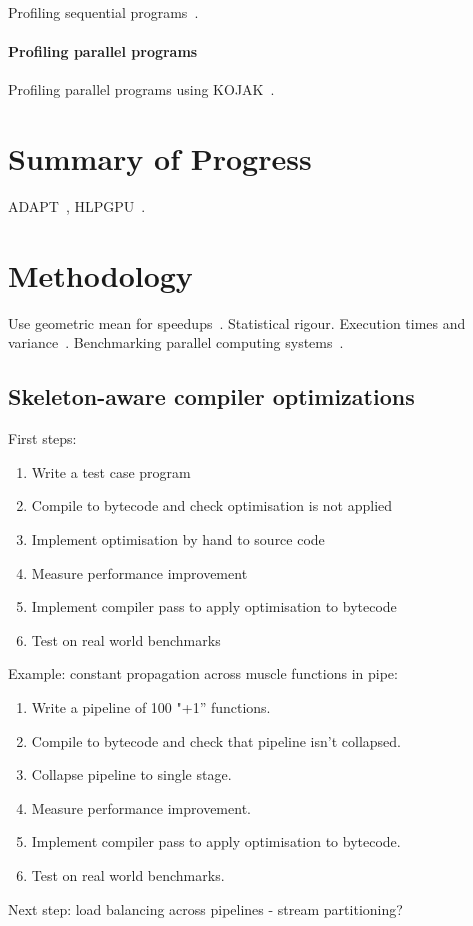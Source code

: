 Profiling sequential programs~\cite{Ball1994}.

\paragraph{Profiling parallel programs} Profiling parallel programs
using KOJAK~\cite{Mohr2003}.


\section{Summary of Progress}

ADAPT~\cite{Cummins2015a}, HLPGPU~\cite{Cummins2016}.


\section{Methodology}

Use geometric mean for speedups~\cite{Fleming1986}. Statistical
rigour\cite{Georges2007}. Execution times and
variance~\cite{Box}. Benchmarking parallel computing
systems~\cite{Belli2015}.


\subsection{Skeleton-aware compiler optimizations}

First steps:
%
\begin{enumerate}
\item Write a test case program
\item Compile to bytecode and check optimisation is not applied
\item Implement optimisation by hand to source code
\item Measure performance improvement
\item Implement compiler pass to apply optimisation to bytecode
\item Test on real world benchmarks
\end{enumerate}
%
Example: constant propagation across muscle functions in pipe:
%
\begin{enumerate}
\item Write a pipeline of 100 "+1” functions.
\item Compile to bytecode and check that pipeline isn’t collapsed.
\item Collapse pipeline to single stage.
\item Measure performance improvement.
\item Implement compiler pass to apply optimisation to bytecode.
\item Test on real world benchmarks.
\end{enumerate}
%
Next step: load balancing across pipelines - stream partitioning?

